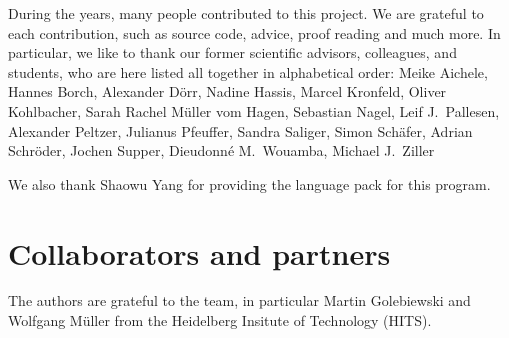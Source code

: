 During the years, many people contributed to this project.
We are grateful to each contribution, such as source code, advice, proof reading
and much more. In particular, we like to thank our former scientific advisors,
colleagues, and students, who are here listed all together in alphabetical
order:
Meike Aichele,
Hannes Borch,
Alexander D\"orr,
Nadine Hassis,
Marcel Kronfeld,
Oliver Kohlbacher,
Sarah Rachel M\"uller vom Hagen,
Sebastian Nagel,
Leif J.~Pallesen,
Alexander Peltzer,
Julianus Pfeuffer,
Sandra Saliger,
Simon Sch\"afer,
Adrian Schr\"oder,
Jochen Supper,
Dieudonn\'e M.~Wouamba,
Michael J.~Ziller

We also thank Shaowu Yang for providing the \Chinese language pack for this program.


\section{Collaborators and partners}

The authors are grateful to the \SABIO team, in particular Martin Golebiewski and Wolfgang M\"uller from the Heidelberg Insitute of Technology (HITS).

%
